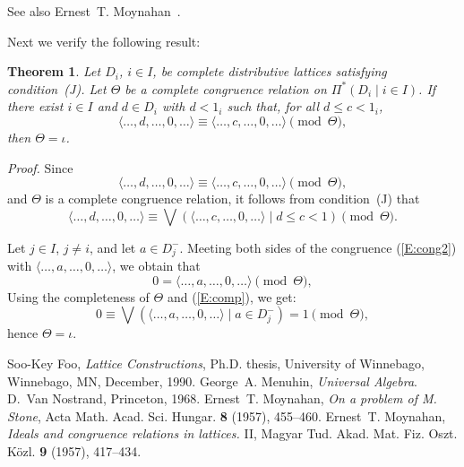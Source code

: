 \documentclass{article}
\newtheorem{theorem}{Theorem}
\begin{document}
See also Ernest~T. Moynahan~\cite{eM57a}.

Next we verify the following result:

\begin{theorem}\label{T:P*} 
   Let $D_{i}$, $i \in I$, be complete distributive 
   lattices satisfying condition~\textup{(J)}.  Let $\Theta$
   be a complete congruence relation on 
   $\Pi^{*} ( D_{i} \mid i \in I )$. 
   If there exist $i \in I$ and $d \in D_{i}$ with 
   $d < 1_{i}$ such that, for all $d \leq c < 1_{i}$, 
   \begin{equation}\label{E:cong1} 
      \langle \ldots, d, \ldots, 0, \ldots \rangle \equiv 
      \langle \ldots, c, \ldots, 0, \ldots \rangle \pmod{\Theta}, 
   \end{equation}
   then $\Theta = \iota$.
\end{theorem}

\emph{Proof.} Since 
\begin{equation}\label{E:cong2}
   \langle \ldots, d, \ldots, 0, \ldots \rangle \equiv 
   \langle \ldots, c, \ldots, 0, \ldots \rangle \pmod{\Theta}, 
\end{equation}
and $\Theta$ is a complete congruence relation, it follows 
from condition~(J) that
\begin{equation}\label{E:cong}
    \langle \ldots, d, \ldots, 0, \ldots \rangle \equiv
    \bigvee ( \langle \ldots, c, \ldots, 0, \ldots \rangle 
    \mid d \leq c < 1 ) \pmod{\Theta}. 
\end{equation}

Let $j \in I$, $j \neq i$, and let $a \in D_{j}^{-}$. 
Meeting both sides of the congruence (\ref{E:cong2}) with 
$\langle \ldots, a, \ldots, 0, \ldots \rangle$, we obtain that
\begin{equation}\label{E:comp}
   0 = \langle \ldots, a, \ldots, 0, \ldots \rangle \pmod{\Theta}, 
\end{equation}
Using the completeness of $\Theta$ and (\ref{E:comp}), 
we get:
\[
   0 \equiv \bigvee ( \langle \ldots, a, \ldots, 0, \ldots 
   \rangle \mid a \in D_{j}^{-} ) = 1 \pmod{\Theta}, 
\]
hence $\Theta = \iota$.

\begin{thebibliography}{9}
      Soo-Key Foo, 
      \emph{Lattice Constructions}, 
      Ph.D. thesis, 
      University of Winnebago, Winnebago, MN, December, 1990.
      George~A. Menuhin, 
      \emph{Universal Algebra}. 
      D.~Van Nostrand, Princeton, 1968.
      Ernest~T. Moynahan, 
      \emph{On a problem of M. Stone},
      Acta Math. Acad. Sci. Hungar. \textbf{8} (1957), 455--460.
      Ernest~T. Moynahan, 
      \emph{Ideals and congruence relations in lattices.} II,
      Magyar Tud. Akad. Mat. Fiz. Oszt. K\"{o}zl. \textbf{9} 
      (1957), 417--434.
\end{thebibliography}
\end{document}
